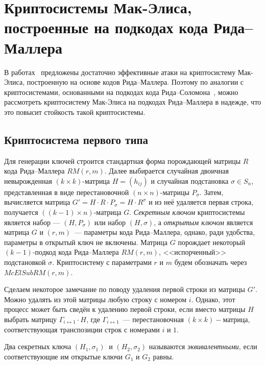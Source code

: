 \section{Криптосистемы Мак-Элиса, построенные на подкодах кода Рида--Маллера}
В работах~\cite{minder2007cryptanalysis,borodin2014effective} предложены достаточно эффективные атаки на криптосистему Мак-Элиса, построенную на основе кодов Рида--Маллера.
Поэтому по аналогии с криптосистемами, основанными на подкодах кода Рида--Соломона~\cite{berger2005how}, можно рассмотреть криптосистему Мак-Элиса на подкодах Рида--Маллера в надежде, что это повысит стойкость такой криптосистемы.

\subsection{Криптосистема первого типа}
Для генерации ключей строится стандартная форма порождающей матрицы \(R\) кода Рида--Маллера $RM(r,m) $.
Далее выбирается случайная двоичная невырожденная \((k\times k)\)-матрица \(H=(h_{ij})\) и случайная подстановка \(\sigma\in S_n\), представленная в виде перестановочной \((n\times n)\)-матрицы \(P_\sigma\).
Затем, вычисляется матрица \(G'=H\cdot R\cdot P_{\sigma}=H\cdot R^{ \sigma}\) и из неё удаляется первая строка, получается \(((k-1)\times  n)\)-матрица \(G\).
\emph{Секретным ключом} криптосистемы является набор --- \((H,P_{\sigma})\) или набор \((H,\sigma)\), а \emph{открытым ключом} является матрица \(G\) и \((r,m)\)~--- параметры кода Рида--Маллера, однако, ради удобства, параметры в открытый ключ не включены.
Матрица \(G\)  порождает некоторый \((k-1)\)-подкод кода Рида--Маллера \(RM(r,m)\), <<испорченный>> подстановкой \(\sigma\).
Криптосистему с параметрами $r$ и $m$ будем обозначать через $McElSubRM(r,m)$.

Сделаем некоторое замечание по поводу удаления первой строки из матрицы \(G'\).
Можно удалять из этой матрицы любую строку с номером \(i\).
Однако, этот процесс может быть сведён к удалению первой строки, если вместо матрицы \(H\) выбрать матрицу \(\Gamma_{i\leftrightarrow 1} \cdot H\), где \(\Gamma_{i\leftrightarrow 1}\)~--- перестановочная \((k\times k)-\)матрица, соответствующая транспозиции строк с номерами $i$ и $1$.

\begin{definition}
	Два секретных ключа \((H_1,\sigma_1) \  \) и \((H_2, \sigma_2 )\) называются \emph{эквивалентными}, если соответствующие им открытые ключи \(G_1\) и \(G_2\) равны.
\end{definition}

